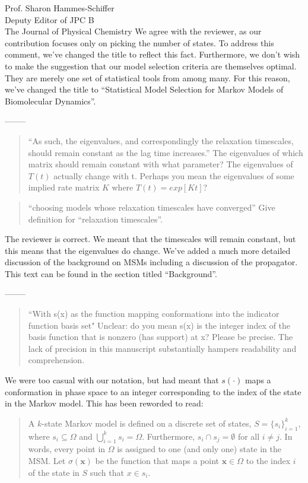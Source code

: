 \documentclass{letter}
\newcommand{\separate}{\begin{center}--------\end{center}}
\begin{document}
\begin{letter}{Prof. Sharon Hammes-Schiffer \\ Deputy Editor of JPC B \\ The Journal of Physical Chemistry}
We agree with the reviewer, as our contribution focuses only on picking the number of states. To address this comment, we've changed the title to reflect this fact. Furthermore, we don't wish to make the suggestion that our model selection criteria are themselves optimal. They are merely one set of statistical tools from among many. For this reason, we've changed the title to ``Statistical Model Selection for Markov Models of Biomolecular Dynamics''.


\separate
\begin{quote}
``As such, the eigenvalues, and correspondingly the relaxation timescales, should remain constant as the lag time increases.''  The eigenvalues of which matrix should remain constant with what parameter?  The eigenvalues of $T(t)$ actually change with t.  Perhaps you mean the eigenvalues of some implied rate matrix $K$ where $T(t) = exp[Kt]$?
\end{quote}

\begin{quote}
``choosing models whose relaxation timescales have converged''  Give definition for ``relaxation timescales''.
\end{quote}

The reviewer is correct. We meant that the timescales will remain constant, but this means that the eigenvalues do change. We've added a much more detailed discussion of the background on MSMs including a discussion of the propagator. This text can be found in the section titled ``Background''.

\separate
\begin{quote}
``With s(x) as the function mapping conformations into the indicator function basis set" Unclear: do you mean s(x) is the integer index of the basis function that is nonzero (has support) at x?  Please be precise.  The lack of precision in this manuscript substantially hampers readability and comprehension.
\end{quote}

We were too casual with our notation, but had meant that $s(\cdot)$ maps a conformation in phase space to an integer corresponding to the index of the state in the Markov model. This has been reworded to read:

\begin{quote}
A $k$-state Markov model is defined on a discrete set of states, $S = \{s_i\}_{i=1}^k$, where $s_i \subseteq \Omega$ and $\bigcup_{i=1}^k s_i = \Omega$. Furthermore, $s_i \cap s_j = \emptyset$ for all $i \neq j$. In words, every point in $\Omega$ is assigned to one (and only one) state in the MSM. Let $\sigma(\mathbf{x})$ be the function that maps a point $\mathbf{x} \in \Omega$ to the index $i$ of the state in $S$ such that $x \in s_i$.
\end{quote}


\end{letter}
\end{document}
